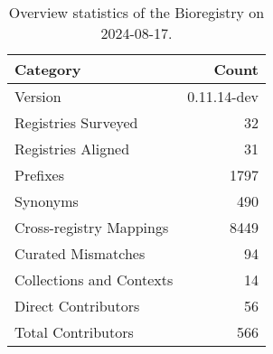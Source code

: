 \begin{table}
\caption{Overview statistics of the Bioregistry on 2024-08-17.}
\label{tab:bioregistry-summary}
\begin{tabular}{lr}
\toprule
Category & Count \\
\midrule
Version & 0.11.14-dev \\
Registries Surveyed & 32 \\
Registries Aligned & 31 \\
Prefixes & 1797 \\
Synonyms & 490 \\
Cross-registry Mappings & 8449 \\
Curated Mismatches & 94 \\
Collections and Contexts & 14 \\
Direct Contributors & 56 \\
Total Contributors & 566 \\
\bottomrule
\end{tabular}
\end{table}
